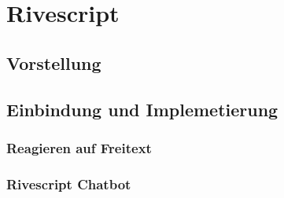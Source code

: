 \chapter{Rivescript}\label{sec:rivescript}
\section{Vorstellung}
\section{Einbindung und Implemetierung}
\subsection{Reagieren auf Freitext}
\subsection{Rivescript Chatbot}